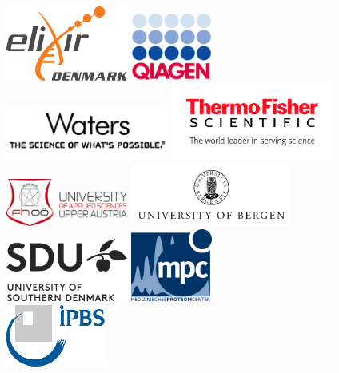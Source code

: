 \begin{center}
  \includegraphics[width=0.3\textwidth]{graphics/ELIXIR.png}\hspace*{2.5cm}
  \includegraphics[width=0.2\textwidth]{graphics/qiagen.jpg}\\[1cm]
  \includegraphics[width=0.4\textwidth]{graphics/waters.jpg}\hspace*{1cm}
  \includegraphics[width=0.4\textwidth]{graphics/thermo.jpg}\\[1cm]
  \includegraphics[width=0.3\textwidth]{graphics/FH.jpg}\hspace*{2cm}
  \includegraphics[width=0.4\textwidth]{graphics/UiBlogo_Eng_gray_m_V8.png}\\[1cm]
  \includegraphics[width=0.3\textwidth]{graphics/SDU_DK+UK_under.jpg}\hspace*{2.5cm}
  \includegraphics[width=0.2\textwidth]{graphics/mpc_logo_small.png}\\[1cm]
  \includegraphics[width=0.25\textwidth]{graphics/ibps.png}
\end{center}
